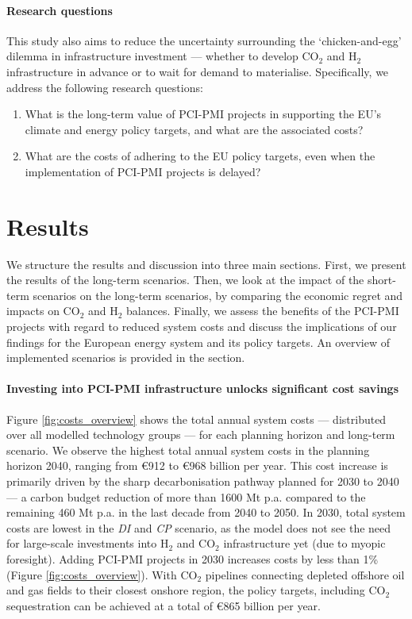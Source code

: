 \documentclass[pdflatex,sn-nature]{sn-jnl}%
\theoremstyle{thmstyleone}%
\theoremstyle{thmstyletwo}%
\theoremstyle{thmstylethree}%
\begin{document}
\paragraph{Research questions}
This study also aims to reduce the uncertainty surrounding the `chicken-and-egg' dilemma in infrastructure investment --- whether to develop CO$_2$ and H$_2$ infrastructure in advance or to wait for demand to materialise. Specifically, we address the following research questions: 
\begin{enumerate} 
  \item What is the long-term value of PCI-PMI projects in supporting the EU’s climate and energy policy targets, and what are the associated costs?
  \item What are the costs of adhering to the EU policy targets, even when the implementation of PCI-PMI projects is delayed?
\end{enumerate}

\section*{Results}\label{sec:results}
We structure the results and discussion into three main sections. First, we present the results of the long-term scenarios. Then, we look at the impact of the short-term scenarios on the long-term scenarios, by comparing the economic regret and impacts on CO$_2$ and H$_2$ balances. Finally, we assess the benefits of the PCI-PMI projects with regard to reduced system costs and discuss the implications of our findings for the European energy system and its policy targets. An overview of implemented scenarios is provided in the  section.

\paragraph{Investing into PCI-PMI infrastructure unlocks significant cost savings}
Figure \ref{fig:costs_overview} shows the total annual system costs --- distributed over all modelled technology groups --- for each planning horizon and long-term scenario. We observe the highest total annual system costs in the planning horizon 2040, ranging from €912 to €968 billion per year. This cost increase is primarily driven by the sharp decarbonisation pathway planned for 2030 to 2040 --- a carbon budget reduction of more than 1600 Mt p.a. compared to the remaining 460 Mt p.a. in the last decade from 2040 to 2050. In 2030, total system costs are lowest in the \textit{DI} and \textit{CP} scenario, as the model does not see the need for large-scale investments into H$_2$ and CO$_2$ infrastructure yet (due to myopic foresight). Adding PCI-PMI projects in 2030 increases costs by less than 1\% (Figure \ref{fig:costs_overview}). With CO$_2$ pipelines connecting depleted offshore oil and gas fields to their closest onshore region, the policy targets, including CO$_2$ sequestration can be achieved at a total of €865 billion per year.
\end{document}
